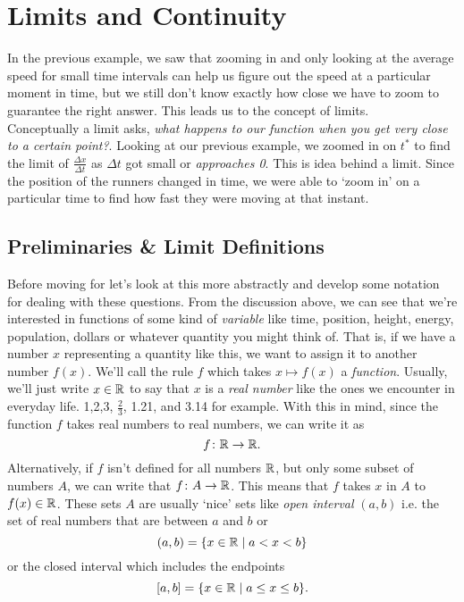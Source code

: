 
\section{Limits and Continuity}


In the previous example, we saw that zooming in and only looking at the average speed for small time intervals can help us figure out the speed at a particular moment in time, but we still don't know exactly how close we have to zoom to guarantee the right answer. This leads us to the concept of limits.\\

Conceptually a limit asks, \emph{what happens to our function when you get very close to a certain point?}. Looking at our previous example, we zoomed in on $t^*$ to find the limit of $\frac{\Delta x}{\Delta t}$ as $\Delta t$ got small or \emph{approaches 0}. This is idea behind a limit. Since the position of the runners changed in time, we were able to `zoom in' on a particular time to find how fast they were moving at that instant.

\subsection{Preliminaries \& Limit Definitions}

Before moving for let's look at this more abstractly and develop some notation for dealing with these questions. From the discussion above, we can see that we're interested in functions of some kind of \emph{variable} like time, position, height, energy, population, dollars or whatever quantity you might think of. That is, if we have a number $x$ representing a quantity like this, we want to assign it to another number $f(x)$.  We'll call the rule $f$ which takes $x\mapsto f(x)$ a \emph{function}. Usually, we'll just write $x\in\mathbb{R}$ to say that $x$ is a \emph{real number} like the ones we encounter in everyday life. 1,2,3, $\frac{2}{3}$, 1.21, and 3.14 for example. With this in mind, since the function $f$ takes real numbers to real numbers, we can write it as
\[
f\colon \mathbb{R} \to \mathbb{R}.
\] Alternatively, if $f$ isn't defined for all numbers $\mathbb{R}$, but only some subset of numbers $A$, we can write that $f\colon A\to\mathbb{R}$. This means that $f$ takes $x$ in $A$ to $f(x)\in\mathbb{R}$. These sets $A$ are usually `nice' sets like \emph{open interval} $(a,b)$ i.e. the set of real numbers that are between $a$ and $b$ or
\[
(a,b)=\{x\in\mathbb{R} \mid a<x<b \}
\]
or the closed interval which includes the endpoints
\[
[a,b]=\{x\in\mathbb{R} \mid a\leq x\leq b \}.
\]

